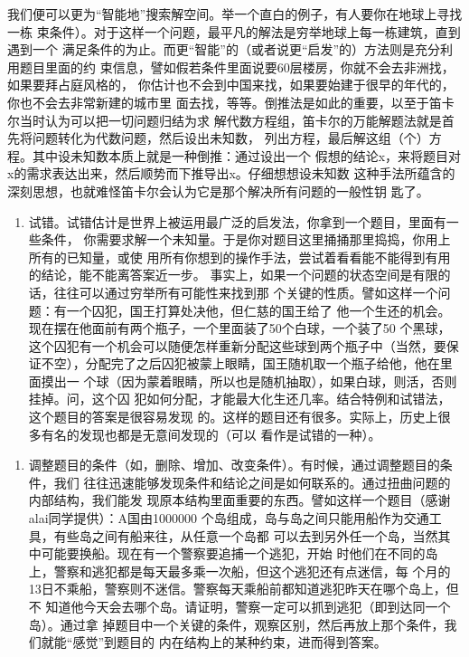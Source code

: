 \documentclass[11pt]{article}
\begin{document}
\begin{itemize}
\begin{enumerate}
我们便可以更为“智能地”搜索解空间。举一个直白的例子，有人要你在地球上寻找一栋
束条件）。对于这样一个问题，最平凡的解法是穷举地球上每一栋建筑，直到遇到一个
满足条件的为止。而更“智能”的（或者说更“启发”的）方法则是充分利用题目里面的约
束信息，譬如假若条件里面说要60层楼房，你就不会去非洲找，如果要拜占庭风格的，
你估计也不会到中国来找，如果要始建于很早的年代的，你也不会去非常新建的城市里
面去找，等等。倒推法是如此的重要，以至于笛卡尔当时认为可以把一切问题归结为求
解代数方程组，笛卡尔的万能解题法就是首先将问题转化为代数问题，然后设出未知数，
列出方程，最后解这组（个）方程。其中设未知数本质上就是一种倒推：通过设出一个
假想的结论x，来将题目对x的需求表达出来，然后顺势而下推导出x。仔细想想设未知数
这种手法所蕴含的深刻思想，也就难怪笛卡尔会认为它是那个解决所有问题的一般性钥
匙了。
\end{enumerate}


\begin{enumerate}
\item 试错。试错估计是世界上被运用最广泛的启发法，你拿到一个题目，里面有一些条件，
你需要求解一个未知量。于是你对题目这里捅捅那里捣捣，你用上所有的已知量，或使
用所有你想到的操作手法，尝试着看看能不能得到有用的结论，能不能离答案近一步。
事实上，如果一个问题的状态空间是有限的话，往往可以通过穷举所有可能性来找到那
个关键的性质。譬如这样一个问题：有一个囚犯，国王打算处决他，但仁慈的国王给了
他一个生还的机会。现在摆在他面前有两个瓶子，一个里面装了50个白球，一个装了50
个黑球，这个囚犯有一个机会可以随便怎样重新分配这些球到两个瓶子中（当然，要保
证不空），分配完了之后囚犯被蒙上眼睛，国王随机取一个瓶子给他，他在里面摸出一
个球（因为蒙着眼睛，所以也是随机抽取），如果白球，则活，否则挂掉。问，这个囚
犯如何分配，才能最大化生还几率。结合特例和试错法，这个题目的答案是很容易发现
的。这样的题目还有很多。实际上，历史上很多有名的发现也都是无意间发现的（可以
看作是试错的一种）。
\end{enumerate}


\begin{enumerate}
\item 调整题目的条件（如，删除、增加、改变条件）。有时候，通过调整题目的条件，我们
往往迅速能够发现条件和结论之间是如何联系的。通过扭曲问题的内部结构，我们能发
现原本结构里面重要的东西。譬如这样一个题目（感谢alai同学提供）：A国由1000000
个岛组成，岛与岛之间只能用船作为交通工具，有些岛之间有船来往，从任意一个岛都
可以去到另外任一个岛，当然其中可能要换船。现在有一个警察要追捕一个逃犯，开始
时他们在不同的岛上，警察和逃犯都是每天最多乘一次船，但这个逃犯还有点迷信，每
个月的13日不乘船，警察则不迷信。警察每天乘船前都知道逃犯昨天在哪个岛上，但不
知道他今天会去哪个岛。请证明，警察一定可以抓到逃犯（即到达同一个岛）。通过拿
掉题目中一个关键的条件，观察区别，然后再放上那个条件，我们就能“感觉”到题目的
内在结构上的某种约束，进而得到答案。
\end{enumerate}



\end{itemize}
\end{document}
